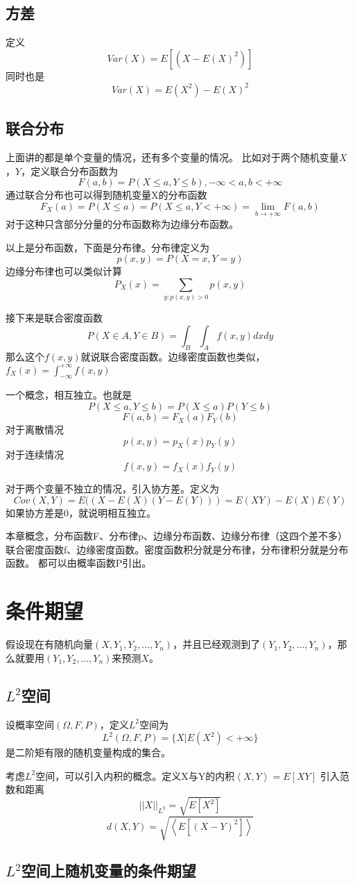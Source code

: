 \documentclass{article}
\begin{document}
\subsection{方差}
定义
$$
Var(X)=E[(X-E(X)^2)]
$$
同时也是
$$
Var(X)=E(X^2)-E(X)^2
$$
\subsection{联合分布}
上面讲的都是单个变量的情况，还有多个变量的情况。
比如对于两个随机变量$X$，$Y$，定义联合分布函数为$$
F(a,b)=P(X \le a,Y \le b),-\infty<a,b<+\infty
$$
通过联合分布也可以得到随机变量X的分布函数
$$
F_X(a)=P(X \le a)=P(X \le a,Y<+\infty)=\lim\limits_{b \rightarrow +\infty}F(a,b)
$$
对于这种只含部分分量的分布函数称为边缘分布函数。

以上是分布函数，下面是分布律。分布律定义为
$$p(x,y)=P(X=x,Y=y)$$
边缘分布律也可以类似计算
$$P_X(x)=\sum\limits_{y:p(x,y)>0}p(x,y)$$

接下来是联合密度函数$$P(X \in A,Y \in B)=\int_B\int_Af(x,y)dxdy$$
那么这个$f(x,y)$就说联合密度函数。边缘密度函数也类似，$f_X(x)=\int_{-\infty}^{+\infty}f(x,y)$

一个概念，相互独立。也就是
$$P(X \le a,Y \le b)=P(X \le a)P(Y \le b)$$
$$F(a,b)=F_X(a)F_Y(b)$$
对于离散情况
$$p(x,y)=p_X(x)p_Y(y)$$
对于连续情况
$$f(x,y)=f_X(x)f_Y(y)$$

对于两个变量不独立的情况，引入协方差。定义为$$
Cov(X,Y)=E((X-E(X)(Y-E(Y)))=E(XY)-E(X)E(Y)
$$
如果协方差是0，就说明相互独立。

本章概念，分布函数F、分布律p、边缘分布函数、边缘分布律（这四个差不多）
联合密度函数f、边缘密度函数。密度函数积分就是分布律，分布律积分就是分布函数。
都可以由概率函数P引出。
\section{条件期望}
假设现在有随机向量$(X,Y_1,Y_2,\dots,Y_n)$，并且已经观测到了$(Y_1,Y_2,\dots,Y_n)$，那么就要用$(Y_1,Y_2,\dots,Y_n)$来预测$X$。
\subsection{$L^2$空间}
设概率空间$(\Omega,F,P)$，定义$L^2$空间为$$
L^2(\Omega,F,P)=\{X|E(X^2)<+\infty\}
$$
是二阶矩有限的随机变量构成的集合。

考虑$L^2$空间，可以引入内积的概念。定义X与Y的内积$\left\langle X,Y \right\rangle=E[XY]$
引入范数和距离
$$
||X||_{L^2}=\sqrt{E[X^2]}
$$
$$
d(X,Y)=\sqrt{\left\langle E[(X-Y)^2] \right\rangle}
$$
\subsection{$L^2$空间上随机变量的条件期望}
\end{document}

